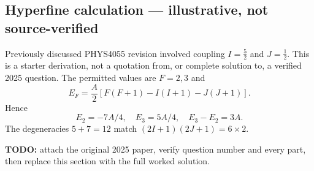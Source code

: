 
\subsection{Hyperfine calculation — illustrative, not source-verified}
Previously discussed PHYS4055 revision involved coupling
\(I=\frac52\) and \(J=\frac12\). This is a starter derivation,
not a quotation from, or complete solution to, a verified 2025 question.
The permitted values are \(F=2,3\) and
\[
E_F=\frac A2[F(F+1)-I(I+1)-J(J+1)].
\]
Hence
\[
\boxed{E_2=-7A/4,\quad E_3=5A/4,\quad E_3-E_2=3A.}
\]
The degeneracies \(5+7=12\) match
\((2I+1)(2J+1)=6\times2\).
\par\textbf{TODO:} attach the original 2025 paper, verify
question number and every part, then replace this section with the
full worked solution.

